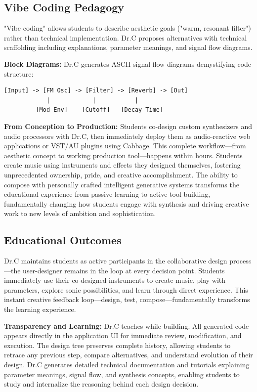 \documentclass[a4paper]{article}
\begin{document}
\subsection{Vibe Coding Pedagogy}

"Vibe coding" allows students to describe aesthetic goals ("warm, resonant filter") rather than technical implementation. Dr.C proposes alternatives with technical scaffolding including explanations, parameter meanings, and signal flow diagrams.

\textbf{Block Diagrams:} Dr.C generates ASCII signal flow diagrams demystifying code structure:

\begin{lstlisting}[basicstyle=\ttfamily\tiny]
[Input] -> [FM Osc] -> [Filter] -> [Reverb] -> [Out]
            |            |           |
         [Mod Env]    [Cutoff]   [Decay Time]
\end{lstlisting}

\textbf{From Conception to Production:} Students co-design custom synthesizers and audio processors with Dr.C, then immediately deploy them as audio-reactive web applications or VST/AU plugins using Cabbage. This complete workflow—from aesthetic concept to working production tool—happens within hours. Students create music using instruments and effects they designed themselves, fostering unprecedented ownership, pride, and creative accomplishment. The ability to compose with personally crafted intelligent generative systems transforms the educational experience from passive learning to active tool-building, fundamentally changing how students engage with synthesis and driving creative work to new levels of ambition and sophistication.

\subsection{Educational Outcomes}

Dr.C maintains students as active participants in the collaborative design process—the user-designer remains in the loop at every decision point. Students immediately use their co-designed instruments to create music, play with parameters, explore sonic possibilities, and learn through direct experience. This instant creative feedback loop—design, test, compose—fundamentally transforms the learning experience.

\textbf{Transparency and Learning:} Dr.C teaches while building. All generated code appears directly in the application UI for immediate review, modification, and execution. The design tree preserves complete history, allowing students to retrace any previous step, compare alternatives, and understand evolution of their design. Dr.C generates detailed technical documentation and tutorials explaining parameter meanings, signal flow, and synthesis concepts, enabling students to study and internalize the reasoning behind each design decision.
\end{document}
